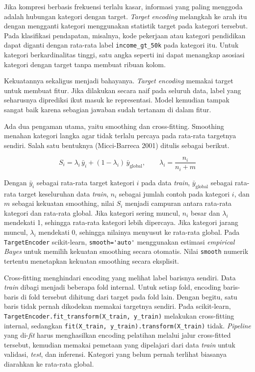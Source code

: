 Jika kompresi berbasis frekuensi terlalu kasar, informasi yang paling menggoda adalah hubungan kategori dengan target. \emph{Target encoding} melangkah ke arah itu dengan mengganti kategori menggunakan statistik target pada kategori tersebut. Pada klasifikasi pendapatan, misalnya, kode pekerjaan atau kategori pendidikan dapat diganti dengan rata-rata label \passthrough{\lstinline!income_gt_50k!} pada kategori itu. Untuk kategori berkardinalitas tinggi, satu angka seperti ini dapat menangkap asosiasi kategori dengan target tanpa membuat ribuan kolom.

Kekuatannya sekaligus menjadi bahayanya. \emph{Target encoding} memakai target untuk membuat fitur. Jika dilakukan secara naif pada seluruh data, label yang seharusnya diprediksi ikut masuk ke representasi. Model kemudian tampak sangat baik karena sebagian jawaban sudah tertanam di dalam fitur.

Ada dua pengaman utama, yaitu smoothing dan cross-fitting. Smoothing menahan kategori langka agar tidak terlalu percaya pada rata-rata targetnya sendiri. Salah satu bentuknya (Micci-Barreca 2001) ditulis sebagai berikut.

\[
S_i = \lambda_i\, \bar{y}_i + (1 - \lambda_i)\, \bar{y}_{\text{global}}, \qquad \lambda_i = \frac{n_i}{n_i + m}
\]

Dengan \(\bar{y}_i\) sebagai rata-rata target kategori \(i\) pada data \emph{train}, \(\bar{y}_{\text{global}}\) sebagai rata-rata target keseluruhan data \emph{train}, \(n_i\) sebagai jumlah contoh pada kategori \(i\), dan \(m\) sebagai kekuatan smoothing, nilai \(S_i\) menjadi campuran antara rata-rata kategori dan rata-rata global. Jika kategori sering muncul, \(n_i\) besar dan \(\lambda_i\) mendekati 1, sehingga rata-rata kategori lebih dipercaya. Jika kategori jarang muncul, \(\lambda_i\) mendekati 0, sehingga nilainya menyusut ke rata-rata global. Pada \passthrough{\lstinline!TargetEncoder!} scikit-learn, \passthrough{\lstinline!smooth='auto'!} menggunakan estimasi \emph{empirical Bayes} untuk memilih kekuatan smoothing secara otomatis. Nilai \passthrough{\lstinline!smooth!} numerik tertentu menetapkan kekuatan smoothing secara eksplisit.

Cross-fitting menghindari encoding yang melihat label barisnya sendiri. Data \emph{train} dibagi menjadi beberapa fold internal. Untuk setiap fold, encoding baris-baris di fold tersebut dihitung dari target pada fold lain. Dengan begitu, satu baris tidak pernah dikodekan memakai targetnya sendiri. Pada scikit-learn, \passthrough{\lstinline!TargetEncoder.fit_transform(X_train, y_train)!} melakukan cross-fitting internal, sedangkan \passthrough{\lstinline!fit(X_train, y_train).transform(X_train)!} tidak. \emph{Pipeline} yang di-\emph{fit} harus menghasilkan encoding pelatihan melalui jalur cross-fitted tersebut, kemudian memakai pemetaan yang dipelajari dari data \emph{train} untuk validasi, \emph{test}, dan inferensi. Kategori yang belum pernah terlihat biasanya diarahkan ke rata-rata global.

